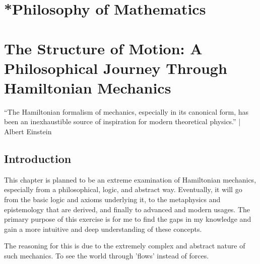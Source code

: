 \chapter{*Philosophy of Mathematics}
\chapter{The Structure of Motion: A Philosophical Journey Through Hamiltonian Mechanics}
“The Hamiltonian formalism of mechanics, especially in its canonical form, has been an inexhaustible source of inspiration for modern theoretical physics.” | Albert Einstein
\section{Introduction}
\par This chapter is planned to be an extreme examination of Hamiltonian mechanics, especially from a philosophical, logic, and abstract way. Eventually, it will go from the basic logic and axioms underlying it, to the metaphysics and epistemology that are derived, and finally to advanced and modern usages. The primary purpose of this exercise is for me to find the gaps in my knowledge and gain a more intuitive and deep understanding of these concepts.
\par The reasoning for this is due to the extremely complex and abstract nature of such mechanics. To see the world through 'flows' instead of forces.
